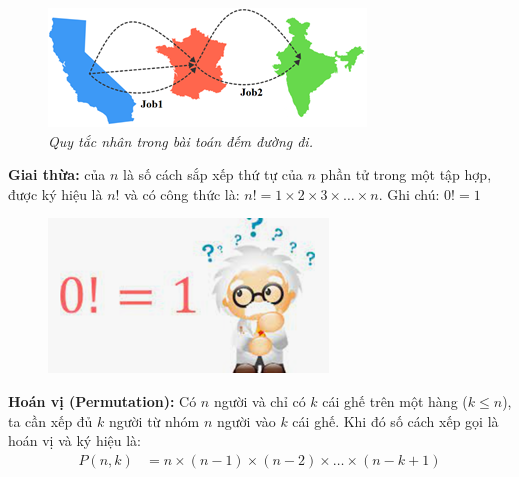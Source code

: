 \begin{multicols}{2}
	\begin{figure}[H]
		\centering
		\vspace*{-5pt}
		\captionsetup{labelformat=empty, justification=centering}
		\includegraphics[width=1\linewidth]{_2}
		\caption{\small\textit{\color{toancuabi}Quy tắc nhân trong bài toán đếm đường đi.}}
		\vspace*{-10pt}
	\end{figure}
	\textbf{\color{toancuabi}Giai thừa:} của $n$ là số cách sắp xếp thứ tự của $n$ phần tử trong một tập hợp, được ký hiệu là $n!$ và có công thức là: $n!=1\times 2\times 3\times \ldots\times n $.
	\vskip 0.1cm
	Ghi chú: $0!=1$
	\begin{figure}[H]
		\centering
		\vspace*{5pt}
		\captionsetup{labelformat=empty, justification=centering}
		\includegraphics[width=1\linewidth]{_3}
		\vspace*{-15pt}
	\end{figure}
	\textbf{\color{toancuabi}Hoán vị (Permutation):} Có $n$ người và chỉ có $k$ cái ghế trên một hàng ($k\le n$), ta cần xếp đủ $k$ người từ nhóm $n$ người vào $k$ cái ghế. Khi đó số cách xếp gọi là hoán vị và ký hiệu là:
	\begin{align*}
		P(n,k)&=n\!\times\!(n\!-\!1)\!\!\times\!\!(n\!-\!2)\!\!\times\!\!\ldots\!\!\times\!\!(n\!-\!k\!+\!1\!)\\

\end{align*}
\end{multicols}
